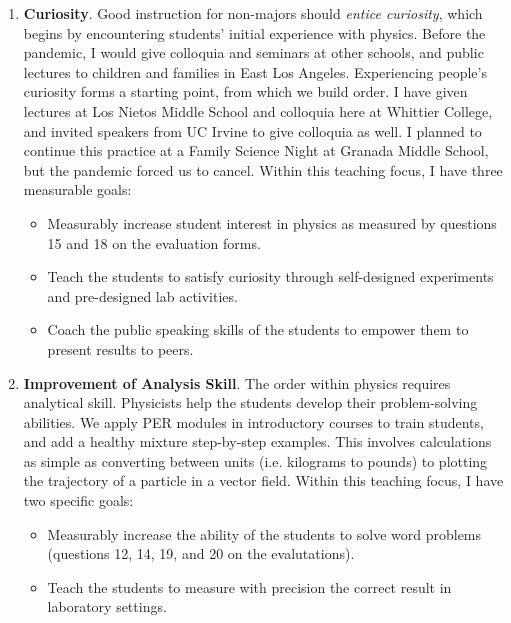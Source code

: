 \documentclass[../../../main.tex]{subfiles}
\begin{document}
\begin{enumerate}

\item \textbf{Curiosity}.  Good instruction for non-majors should \textit{entice curiosity}, which begins by encountering students' initial experience with physics.  Before the pandemic, I would give colloquia and seminars at other schools, and public lectures to children and families in East Los Angeles.  Experiencing people's curiosity forms a starting point, from which we build order.  I have given lectures at Los Nietos Middle School and colloquia here at Whittier College, and invited speakers from UC Irvine to give colloquia as well.  I planned to continue this practice at a Family Science Night at Granada Middle School, but the pandemic forced us to cancel.  Within this teaching focus, I have three measurable goals:

\begin{itemize}
\item Measurably increase student interest in physics as measured by questions 15 and 18 on the evaluation forms.
\item Teach the students to satisfy curiosity through self-designed experiments and pre-designed lab activities.
\item Coach the public speaking skills of the students to empower them to present results to peers.
\end{itemize}

\item \textbf{Improvement of Analysis Skill}.  The order within physics requires analytical skill.  Physicists help the students develop their problem-solving abilities.  We apply PER modules in introductory courses to train students, and add a healthy mixture step-by-step examples.  This involves calculations as simple as converting between units (i.e. kilograms to pounds) to plotting the trajectory of a particle in a vector field.  Within this teaching focus, I have two specific goals:

\begin{itemize}
\item Measurably increase the ability of the students to solve word problems (questions 12, 14, 19, and 20 on the evalutations).
\item Teach the students to measure with precision the correct result in laboratory settings.
\end{itemize}


\end{enumerate}
\end{document}
